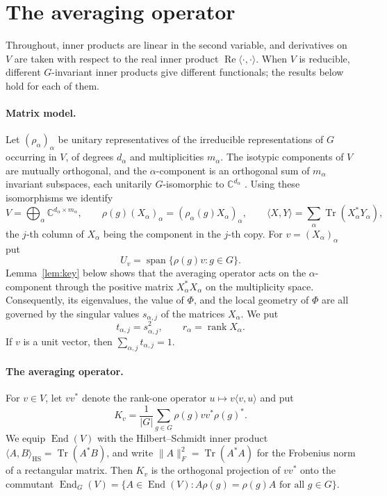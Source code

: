 \documentclass{amsart}
\theoremstyle{remark}
\DeclareMathOperator{\Span}{span}
\DeclareMathOperator{\Tr}{Tr}
\DeclareMathOperator{\rank}{rank}
\DeclareMathOperator{\End}{End}
\newcommand{\C}{\mathbb C}
\newcommand{\norm}[1]{\lVert #1\rVert}
\begin{document}
\section{The averaging operator}\label{sec:avg}
 
Throughout, inner products are linear in the second variable, and derivatives on $V$ are
taken with respect to the real inner product $\operatorname{Re}\langle\cdot,\cdot\rangle$. When $V$ is
reducible, different $G$-invariant inner products give different functionals; the results below hold
for each of them.
 
\paragraph{Matrix model.}
Let $(\rho_\alpha)_\alpha$ be unitary representatives of the irreducible representations of $G$
occurring in $V$, of degrees $d_\alpha$ and multiplicities $m_\alpha$. The isotypic components of
$V$ are mutually orthogonal, and the $\alpha$-component is an orthogonal sum of $m_\alpha$
invariant subspaces, each unitarily $G$-isomorphic to $\C^{d_\alpha}$ \cite{Serre1977}. Using these
isomorphisms we identify
\[
 V=\bigoplus_\alpha \C^{d_\alpha\times m_\alpha},\qquad
 \rho(g)(X_\alpha)_\alpha=(\rho_\alpha(g)X_\alpha)_\alpha,\qquad
 \langle X,Y\rangle=\sum_\alpha\Tr(X_\alpha^*Y_\alpha),
\]
the $j$-th column of $X_\alpha$ being the component in the $j$-th copy. For
$v=(X_\alpha)_\alpha$ put
\[
 U_v=\Span\{\rho(g)v:g\in G\}.
\]
Lemma~\ref{lem:key} below shows that the averaging operator acts on the $\alpha$-component through
the positive matrix $X_\alpha^*X_\alpha$ on the multiplicity space. Consequently, its eigenvalues, the
value of $\Phi$, and the local geometry of $\Phi$ are all governed by the singular values
$s_{\alpha,j}$ of the matrices $X_\alpha$. We put
\[
 t_{\alpha,j}=s_{\alpha,j}^2,\qquad r_\alpha=\rank X_\alpha.
\]
If $v$ is a unit vector, then $\sum_{\alpha,j}t_{\alpha,j}=1$.
 
\paragraph{The averaging operator.}
For $v\in V$, let $vv^*$ denote the rank-one operator $u\mapsto v\langle v,u\rangle$ and put
\begin{equation}\label{eq:Kv}
 K_v=\frac1{|G|}\sum_{g\in G}\rho(g)vv^*\rho(g)^*.
\end{equation}
We equip $\End(V)$ with the Hilbert--Schmidt inner product
$\langle A,B\rangle_{\mathrm{HS}}=\Tr(A^*B)$, and write $\norm{A}_F^2=\Tr(A^*A)$ for the Frobenius
norm of a rectangular matrix. Then $K_v$ is the orthogonal projection of $vv^*$ onto the commutant
$\End_G(V)=\{A\in\End(V):A\rho(g)=\rho(g)A\text{ for all }g\in G\}$.
 
\end{document}
